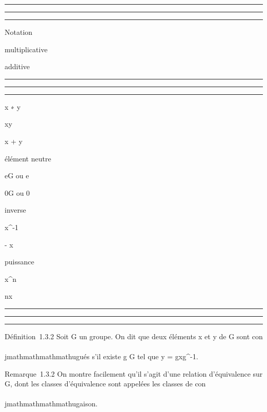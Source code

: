 \begin{center}\rule{3in}{0.4pt}\end{center}

\begin{center}\rule{3in}{0.4pt}\end{center}

\begin{center}\rule{3in}{0.4pt}\end{center}

Notation

multiplicative

additive

\begin{center}\rule{3in}{0.4pt}\end{center}

\begin{center}\rule{3in}{0.4pt}\end{center}

\begin{center}\rule{3in}{0.4pt}\end{center}

x ∗ y

xy

x + y

élément neutre

eG ou e

0G ou 0

inverse

x^-1

- x

puissance

x^n

nx

\begin{center}\rule{3in}{0.4pt}\end{center}

\begin{center}\rule{3in}{0.4pt}\end{center}

\begin{center}\rule{3in}{0.4pt}\end{center}

Définition~1.3.2 Soit G un groupe. On dit que deux éléments x et y de G
sont con\\\\jmathmathmathmathugués s'il existe g \in G tel que y = gxg^-1.

Remarque~1.3.2 On montre facilement qu'il s'agit d'une relation
d'équivalence sur G, dont les classes d'équivalence sont appelées les
classes de con\\\\jmathmathmathmathugaison.

